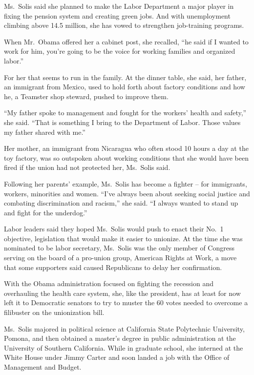 ﻿\documentclass[12pt]{article}
\begin{document}
Ms.~Solis said she planned to make the Labor Department a major player in fixing the pension system
and creating green jobs. And with unemployment climbing above 14.5 million, she has vowed to
strengthen job-training programs.

When Mr.~Obama offered her a cabinet post, she recalled, ``he said if I wanted to work for him,
you're going to be the voice for working families and organized labor.''

For her that seems to run in the family. At the dinner table, she said, her father, an immigrant
from Mexico, used to hold forth about factory conditions and how he, a Teamster shop steward, pushed
to improve them.

``My father spoke to management and fought for the workers' health and safety,'' she said. ``That is
something I bring to the Department of Labor. Those values my father shared with me.''

Her mother, an immigrant from Nicaragua who often stood 10 hours a day at the toy factory, was so
outspoken about working conditions that she would have been fired if the union had not protected
her, Ms.~Solis said.

Following her parents' example, Ms.~Solis has become a fighter -- for immigrants, workers,
minorities and women. ``I've always been about seeking social justice and combating discrimination
and racism,'' she said. ``I always wanted to stand up and fight for the underdog.''

Labor leaders said they hoped Ms.~Solis would push to enact their No.~1 objective, legislation that
would make it easier to unionize. At the time she was nominated to be labor secretary, Ms.~Solis was
the only member of Congress serving on the board of a pro-union group, American Rights at Work, a
move that some supporters said caused Republicans to delay her confirmation.

With the Obama administration focused on fighting the recession and overhauling the health care
system, she, like the president, has at least for now left it to Democratic senators to try to
muster the 60 votes needed to overcome a filibuster on the unionization bill.

Ms.~Solis majored in political science at California State Polytechnic University, Pomona, and then
obtained a master's degree in public administration at the University of Southern California. While
in graduate school, she interned at the White House under Jimmy Carter and soon landed a job with
the Office of Management and Budget.
\end{document}
